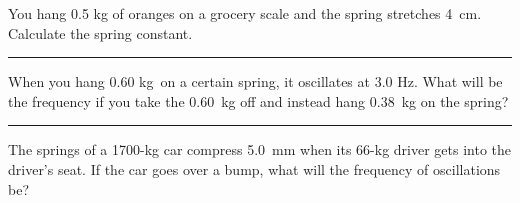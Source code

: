 \documentclass[12pt]{exam}
\begin{document}
\Large

\def\mystrut{\protect\rule[-2.2ex]{0ex}{2.2ex}} 
\qformat{ \textbf{Task \#\thequestion}
  \mystrut  \hfill}




\begin{questions}
  
  \question
    You hang 0.5 kg of oranges on a grocery scale and the spring stretches 4~cm. Calculate the spring constant.


    \vs \hrule \vs

  \question
    When you hang 0.60 kg~on a certain spring, it oscillates at 3.0 Hz. What will be the frequency if you take the 0.60~kg off and instead hang 0.38~kg on the spring?

    \vs \hrule \vs

  \question
    The springs of a 1700-kg car compress 5.0~mm when its 66-kg driver gets into the driver's seat.  If the car goes over a bump, what will the frequency of oscillations be?

    \vs

  
\end{questions}
\end{document}
